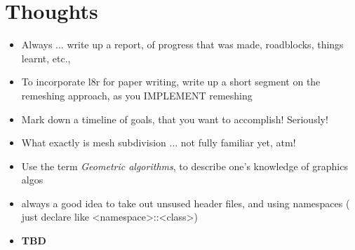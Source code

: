 \documentclass{article}
\begin{document}
\section{Thoughts}
\begin{itemize}
	\item Always ... write up a report, of progress that was made, roadblocks, things learnt, etc., 
	\item To incorporate l8r for paper writing, write up a short segment on the remeshing approach, as you IMPLEMENT remeshing
	\item Mark down a timeline of goals, that you want to accomplish! Seriously!
	\item What exactly is mesh subdivision ... not fully familiar yet, atm!
	\item Use the term \textit{Geometric algorithms}, to describe one's knowledge of graphics algos
	\item always a good idea to take out unsused header files, and using namespaces ( just declare like <namespace>::<class>)
	\item \textbf{TBD} 
\end{itemize}
\end{document}
